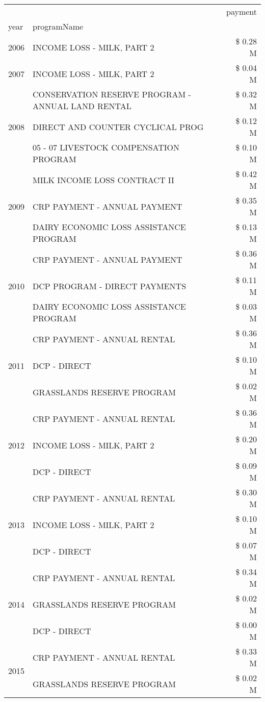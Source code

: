\begin{tabular}{llr}
\toprule
 &  & payment \\
year & programName &  \\
\midrule
2006 & INCOME LOSS - MILK, PART 2 & \$ 0.28 M \\
\cline{1-3}
2007 & INCOME LOSS - MILK, PART 2 & \$ 0.04 M \\
\cline{1-3}
\multirow[t]{3}{*}{2008} & CONSERVATION RESERVE PROGRAM - ANNUAL LAND RENTAL & \$ 0.32 M \\
 & DIRECT AND COUNTER CYCLICAL PROG & \$ 0.12 M \\
 & 05 - 07 LIVESTOCK COMPENSATION PROGRAM & \$ 0.10 M \\
\cline{1-3}
\multirow[t]{3}{*}{2009} & MILK INCOME LOSS CONTRACT II & \$ 0.42 M \\
 & CRP PAYMENT - ANNUAL PAYMENT & \$ 0.35 M \\
 & DAIRY ECONOMIC LOSS ASSISTANCE PROGRAM & \$ 0.13 M \\
\cline{1-3}
\multirow[t]{3}{*}{2010} & CRP PAYMENT - ANNUAL PAYMENT & \$ 0.36 M \\
 & DCP PROGRAM - DIRECT PAYMENTS & \$ 0.11 M \\
 & DAIRY ECONOMIC LOSS ASSISTANCE PROGRAM & \$ 0.03 M \\
\cline{1-3}
\multirow[t]{3}{*}{2011} & CRP PAYMENT - ANNUAL RENTAL & \$ 0.36 M \\
 & DCP - DIRECT & \$ 0.10 M \\
 & GRASSLANDS RESERVE PROGRAM & \$ 0.02 M \\
\cline{1-3}
\multirow[t]{3}{*}{2012} & CRP PAYMENT - ANNUAL RENTAL & \$ 0.36 M \\
 & INCOME LOSS - MILK, PART 2 & \$ 0.20 M \\
 & DCP - DIRECT & \$ 0.09 M \\
\cline{1-3}
\multirow[t]{3}{*}{2013} & CRP PAYMENT - ANNUAL RENTAL & \$ 0.30 M \\
 & INCOME LOSS - MILK, PART 2 & \$ 0.10 M \\
 & DCP - DIRECT & \$ 0.07 M \\
\cline{1-3}
\multirow[t]{3}{*}{2014} & CRP PAYMENT - ANNUAL RENTAL & \$ 0.34 M \\
 & GRASSLANDS RESERVE PROGRAM & \$ 0.02 M \\
 & DCP - DIRECT & \$ 0.00 M \\
\cline{1-3}
\multirow[t]{3}{*}{2015} & CRP PAYMENT - ANNUAL RENTAL & \$ 0.33 M \\
 & GRASSLANDS RESERVE PROGRAM & \$ 0.02 M \\

\end{tabular}
